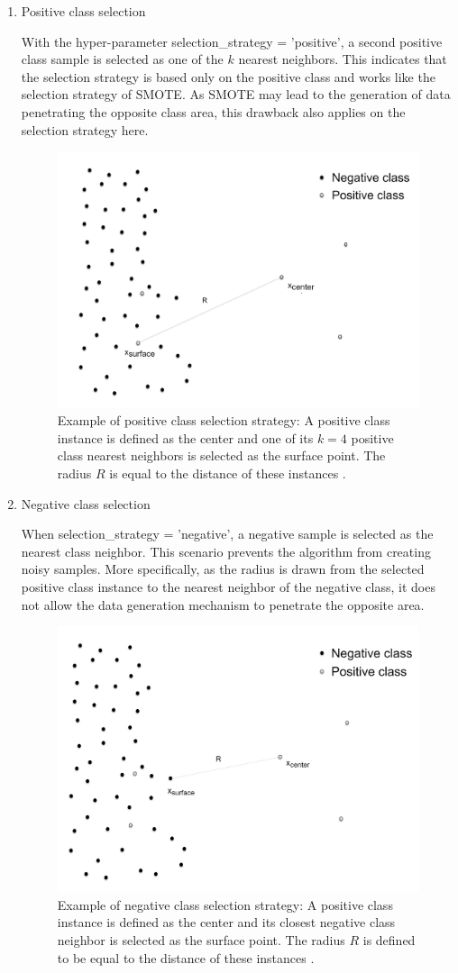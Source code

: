 \documentclass[parskip=full]{scrartcl}
\begin{document}
\begin{enumerate}[label=($\alph*$)]

\item Positive class selection

With the hyper-parameter selection\_strategy = 'positive', a second positive 
class sample is selected as one of the \( k \) nearest neighbors. This 
indicates that the selection strategy is based only on the positive class and 
works like the selection strategy of SMOTE. As SMOTE may lead to the generation 
of data penetrating the opposite class area, this drawback also applies on the 
selection strategy here.

\begin{figure}[H]
	\centering
	\includegraphics[width=0.51\linewidth]
		{../analysis/positive_class_selection_strategy}
	\caption{Example of positive class selection strategy: A positive class 
	instance is defined as the center and one of its \( k = 4 \) positive 
	class nearest neighbors is selected as the surface point. The radius 
	\( R \) is equal to the distance of these instances 
	\cite{Douzas.2019}.}
	\label{fig:positiveclassselectionstrategy}
\end{figure}

\item Negative class selection

When selection\_strategy = 'negative', a negative sample is selected as the 
nearest class neighbor. This scenario prevents the algorithm from creating 
noisy samples. More specifically, as the radius is drawn from the selected 
positive class instance to the nearest neighbor of the negative class, it does 
not allow the data generation mechanism to penetrate the opposite area.

\begin{figure}[H]
	\centering
	\includegraphics[width=0.5\linewidth]
		{../analysis/negative_class_selection_strategy}
	\caption{Example of negative class selection strategy: A positive class 
	instance is defined as the center and its closest negative class neighbor 
	is selected as the surface point. The radius \( R \) is defined to be 
	equal to the distance of these instances \cite{Douzas.2019}.}
	\label{fig:negativeclassselectionstrategy}
\end{figure}


\end{enumerate}
\end{document}
